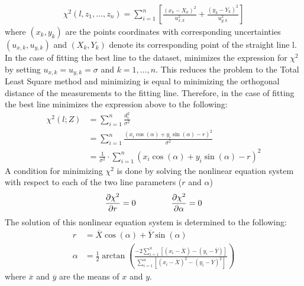 \documentclass[../Head/Main.tex]{subfiles}
\begin{document}
\begin{align}
    \chi^2\left(l, z_1, ..., z_n\right) = \sum_{i = 1}^{n} \left[\frac{\left(x_k - X_k\right)^2}{u_{x, k}^{2}} + \frac{\left(y_k - Y_k\right)^2}{u_{y, k}^{2}}\right]
\end{align}
where $(x_k,y_k)$ are the points coordinates with corresponding uncertainties $(u_{x, k},u_{y, k})$ and $(X_k,Y_k)$ denote its corresponding point of the straight line l. In the case of fitting the best line to the dataset, minimizes the expression for $\chi^2$ by setting $u_{x, k}=u_{y, k}=\sigma$ and $k=1,…,n$. This reduces the problem to the Total Least Square method and minimizing is equal to minimizing the orthogonal distance of the measurements to the fitting line. Therefore, in the case  of fitting the best line minimizes the expression above to the following:
\begin{align}
    \chi^2\left(l; Z\right) &= \sum_{i = 1}^{n} \frac{d_i^2}{\sigma^2} \\
    &= \sum_{i = 1}^{n}\frac{\left(x_i\cos(\alpha) + y_i\sin⁡(\alpha)-r\right)^2}{\sigma^2}\\
    &= \frac{1}{\sigma^2}\cdot\sum_{i = 1}^{n}\left(x_i\cos(\alpha) + y_i\sin⁡(\alpha)-r\right)^2
\end{align}
A condition for minimizing $\chi^2$ is done by solving the nonlinear equation system with respect to each of the two line parameters ($r$ and $\alpha$)
\begin{align}
    \frac{\partial\chi^2}{\partial r} = 0 \hspace{1.5cm} \frac{\partial\chi^2}{\partial\alpha} = 0
\end{align}
The solution of this nonlinear equation system is determined to the following:
\begin{align}
	r &= \overline{X}\cos(\alpha)+\overline{Y}\sin(\alpha) \\
    \alpha &= \frac{1}{2}\arctan\left(\frac{-2\sum_{i=1}^{n}\left[\left(x_i-\overline{X}\right) - \left(y_i-\overline{Y}\right)\right]}{\sum_{i = 1}^{n}\left[\left(x_i-\overline{X}\right)^2 - \left(y_i-\overline{Y}\right)^2\right]}\right)
\end{align}
where $\overline{x}$ and $\overline{y}$ are the means of $x$ and $y$. \par
\end{document}
